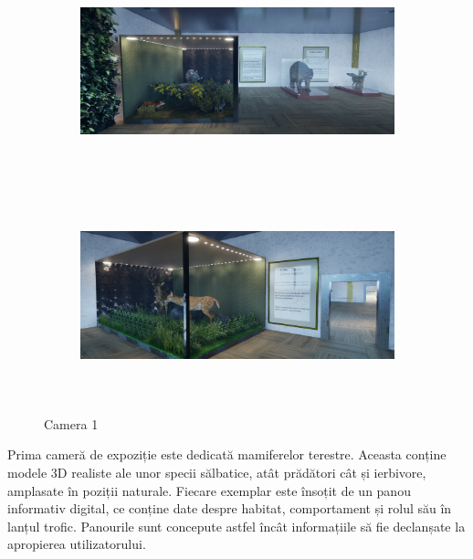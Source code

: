 \begin{figure}[h!]
    \centering
    \begin{subfigure}{0.49\textwidth}
        \includegraphics[width=\linewidth, height=6cm]{continut/capitol3/figuri/camera1.png}
        \label{fig:Room1}
    \end{subfigure}
    \hfill
    \begin{subfigure}{0.49\textwidth}
        \includegraphics[width=\linewidth, height=6cm]{continut/capitol3/figuri/camera1_2.png}
        \label{fig:Room1}
    \end{subfigure}
    \caption{Camera 1}
\end{figure}

Prima cameră de expoziție este dedicată mamiferelor terestre. Aceasta conține modele 3D realiste ale unor specii sălbatice, atât prădători cât și ierbivore, amplasate în poziții naturale. Fiecare exemplar este însoțit de un panou informativ digital, ce conține date despre habitat, comportament și rolul său în lanțul trofic. Panourile sunt concepute astfel încât informațiile să fie declanșate la apropierea utilizatorului.


